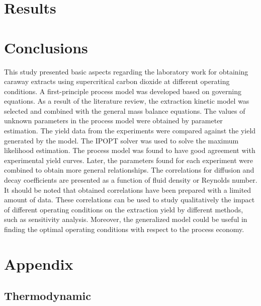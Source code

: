 \documentclass[a4paper,fleqn]{cas-dc}
\begin{document}
\section{Results}


\section{Conclusions} \label{CH: Conclusion}

This study presented basic aspects regarding the laboratory work for obtaining caraway extracts using supercritical carbon dioxide at different operating conditions. A first-principle process model was developed based on governing equations. As a result of the literature review, the extraction kinetic model was selected and combined with the general mass balance equations. The values of unknown parameters in the process model were obtained by parameter estimation. The yield data from the experiments were compared against the yield generated by the model. The IPOPT solver was used to solve the maximum likelihood estimation. The process model was found to have good agreement with experimental yield curves. Later, the parameters found for each experiment were combined to obtain more general relationships. The correlations for diffusion and decay coefficients are presented as a function of fluid density or Reynolds number. It should be noted that obtained correlations have been prepared with a limited amount of data. These correlations can be used to study qualitatively the impact of different operating conditions on the extraction yield by different methods, such as sensitivity analysis. Moreover, the generalized model could be useful in finding the optimal operating conditions with respect to the process economy.

\clearpage
%



\clearpage \appendix \label{appendix}
\section{Appendix} 
\subsection{Thermodynamic}

%
\end{document}

